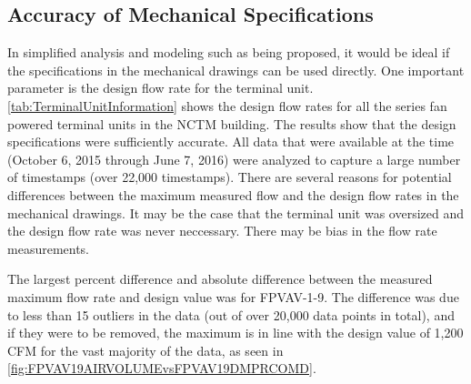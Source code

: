 \subsection{Accuracy of Mechanical Specifications}

In simplified analysis and modeling such as being proposed, it would be ideal if the specifications in the mechanical drawings can be used directly. One important parameter is the design flow rate for the terminal unit. \tableref \ref{tab:TerminalUnitInformation} shows the design flow rates for all the series fan powered terminal units in the NCTM building. The results show that the design specifications were sufficiently accurate.  All data that were available at the time (October 6, 2015 through June 7, 2016) were analyzed to capture a large number of timestamps (over 22,000 timestamps). There are several reasons for potential differences between the maximum measured flow and the design flow rates in the mechanical drawings. It may be the case that the terminal unit was oversized and the design flow rate was never neccessary. There may be bias in the flow rate measurements.  

The largest percent difference and absolute difference between the measured maximum flow rate and design value was for FPVAV-1-9. The difference was due to less than 15 outliers in the data (out of over 20,000 data points in total), and if they were to be removed, the maximum is in line with the design value of 1,200 CFM for the vast majority of the data, as seen in \figref{} \ref{fig:FPVAV19AIRVOLUMEvsFPVAV19DMPRCOMD}. 

